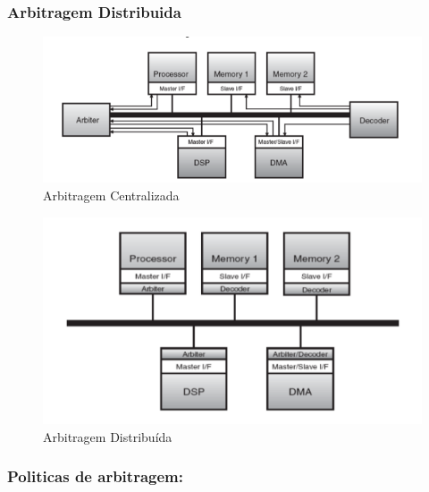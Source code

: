 \documentclass[10pt,a4paper]{paper}
\begin{document}
\subsubsection*{Arbitragem Distribuida}

	
	\begin{figure}[ht]
		\includegraphics[scale=0.5]{fig5.png}
		\centering
		\caption{Arbitragem Centralizada}
		\label{fig:figura2 }
	\end{figure}
	
	\begin{figure}[ht]
		\includegraphics[scale=0.5]{fig6.png}
		\centering
		\caption{Arbitragem Distribuída}
		\label{fig:figura2 }
	\end{figure}
	
	
	\subsubsection*{Politicas de arbitragem:}
\end{document}
